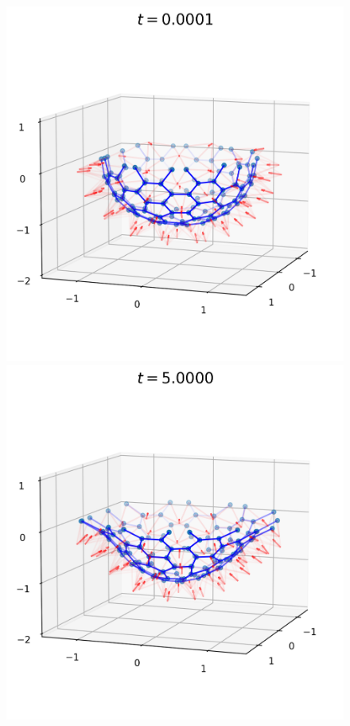 \begin{landscape}
\begin{figure}[p]
	\centering
	\includegraphics[width=0.32\textheight]{dynamics/00000.png}
	\includegraphics[width=0.32\textheight]{dynamics/02000.png}

\end{figure}
\end{landscape}
